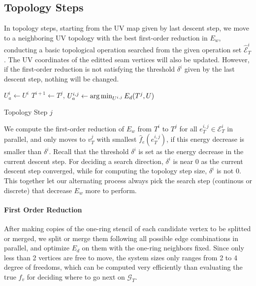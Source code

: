 
\subsection{Topology Steps}
\label{sec:topologyStep}

In topology steps, starting from the UV map given by last descent step, we move to a neighboring UV topology with the best first-order reduction in $E_w$, conducting a basic topological operation searched from the given operation set $\hat{\mathcal{E}}^i_T$. The UV coordinates of the editted seam vertices will also be updated. However, if the first-order reduction is not satisfying the threshold $\delta^i$ given by the last descent step, nothing will be changed.

\begin{algorithm}[h]
\SetAlgoLined
{}
$U_a^{i} \leftarrow U^i$\;
{
  $T^{i+1} \leftarrow T^j$, $U_a^{i,j} \leftarrow \operatorname*{arg\,min}_{U^{i,j}} E_d(T^j,U)$\;
}
\caption{Topology Step $j$}
\end{algorithm}

We compute the first-order reduction of $E_w$ from $T^i$ to $T^j$ for all $e^{i,j}_T \in \mathcal{E}^i_T$ in parallel, and only moves to $v^j_T$ with smallest $\hat{f}_e(e^{i,j}_{T})$, if this energy decrease is smaller than $\delta^i$. Recall that the threshold $\delta^i$ is set as the energy decrease in the current descent step. For deciding a search direction, $\delta^i$ is near $0$ as the current descent step converged, while for computing the topology step size, $\delta^i$ is not $0$. This together let our alternating process always pick the search step (continous or discrete) that decrease $E_w$ more to perform.

\paragraph{First Order Reduction}
After making copies of the one-ring stencil of each candidate vertex to be splitted or merged, we split or merge them following all possible edge combinations in parallel, and optimize $E_d$ on them with the one-ring neighbors fixed. Since only less than 2 vertices are free to move, the system sizes only ranges from 2 to 4 degree of freedoms, which can be computed very efficiently than evaluating the true $f_v$ for deciding where to go next on $\mathcal{G}_T$.

